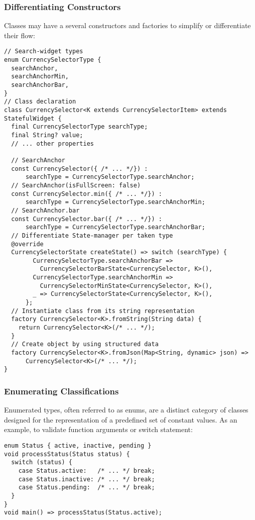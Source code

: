 \subsubsection{Differentiating Constructors}

Classes may have a several constructors and factories to simplify or differentiate their flow:

\begin{lstlisting}
// Search-widget types
enum CurrencySelectorType {
  searchAnchor,
  searchAnchorMin,
  searchAnchorBar,
}
// Class declaration
class CurrencySelector<K extends CurrencySelectorItem> extends StatefulWidget {
  final CurrencySelectorType searchType;
  final String? value;
  // ... other properties

  // SearchAnchor
  const CurrencySelector({ /* ... */}) : 
      searchType = CurrencySelectorType.searchAnchor;
  // SearchAnchor(isFullScreen: false)
  const CurrencySelector.min({ /* ... */}) : 
      searchType = CurrencySelectorType.searchAnchorMin;
  // SearchAnchor.bar
  const CurrencySelector.bar({ /* ... */}) : 
      searchType = CurrencySelectorType.searchAnchorBar;
  // Differentiate State-manager per taken type
  @override
  CurrencySelectorState createState() => switch (searchType) {
        CurrencySelectorType.searchAnchorBar =>
          CurrencySelectorBarState<CurrencySelector, K>(),
        CurrencySelectorType.searchAnchorMin =>
          CurrencySelectorMinState<CurrencySelector, K>(),
        _ => CurrencySelectorState<CurrencySelector, K>(),
      };
  // Instantiate class from its string representation 
  factory CurrencySelector<K>.fromString(String data) {
    return CurrencySelector<K>(/* ... */);
  }
  // Create object by using structured data
  factory CurrencySelector<K>.fromJson(Map<String, dynamic> json) =>
      CurrencySelector<K>(/* ... */);
}
\end{lstlisting}


\newpage
\subsubsection{Enumerating Classifications}

Enumerated types, often referred to as enums, are a distinct category of classes designed for the representation of a 
predefined set of constant values. As an example, to validate function arguments or switch statement:

\begin{lstlisting}
enum Status { active, inactive, pending }
void processStatus(Status status) {
  switch (status) {
    case Status.active:   /* ... */ break;
    case Status.inactive: /* ... */ break;
    case Status.pending:  /* ... */ break;
  }
}
void main() => processStatus(Status.active);
\end{lstlisting}

